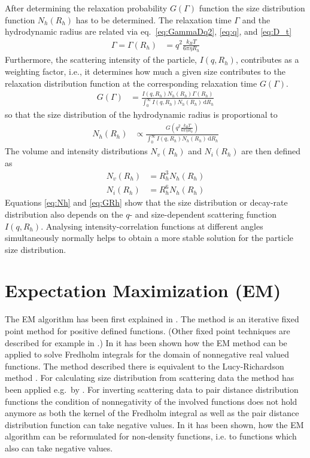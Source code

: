After determining the relaxation probability $G(\Gamma)$ function the size distribution function $N_h(R_h)$ has to be determined. The relaxation time $\Gamma$ and the hydrodynamic radius are related via eq.\ \ref{eq:GammaDq2}, \ref{eq:q}, and \ref{eq:D_t}
\begin{align}
\Gamma = \Gamma(R_h)&= q^2 \frac{k_BT}{6\pi\eta R_h}
\end{align}
Furthermore, the scattering intensity of the particle, $I(q,R_h)$, contributes as a weighting factor, i.e., it determines how much a given size contributes to the relaxation distribution function at the corresponding relaxation time $G(\Gamma)$.
\begin{align}
\label{eq:GRh}
G(\Gamma) &= \frac{I(q,R_h) N_h(R_h) \Gamma(R_h)} {\int_0^\infty I(q,R_h) N_h(R_h) \, \mathrm{d}R_h}
\end{align}
so that the size distribution of the hydrodynamic radius is proportional to
\begin{align}
\label{eq:Nh}
N_h(R_h) &\propto  \frac{G\left(q^2 \frac{k_BT}{6\pi\eta R_h}\right)}{\int_0^\infty I(q,R_h) N_h(R_h) \, \mathrm{d}R_h}
\end{align}
The volume and intensity distributions $N_v(R_h)$ and $N_i(R_h)$ are then defined as
\begin{align}
N_v(R_h) &= R_h^3 N_h(R_h) \\
N_i(R_h) &= R_h^6 N_h(R_h)
\end{align}
Equations \ref{eq:Nh} and \ref{eq:GRh} show that the size distribution or decay-rate distribution also depends on the $q$- and size-dependent scattering function $I(q,R_h)$. Analysing intensity-correlation functions at different angles simultaneously normally helps to obtain a more stable solution for the particle size distribution.

\section{Expectation Maximization (EM)}
The EM algorithm has been first explained in \cite{Dempster1977}. The method is an iterative fixed point method for positive defined functions. (Other fixed point techniques are described for example in \cite{Hanke2000}.) In \cite{Vardi1993} it has been shown how the EM method can be applied to solve Fredholm integrals for the domain of nonnegative real valued functions. The method described there is equivalent to the Lucy\hyp{}Richardson method \cite{Richardson1972,Lucy1974}. For calculating size distribution from scattering data the method has been applied e.g.\ by \cite{Yang2013,Benvenuto2016,Benvenuto2017,Bakry2019}. For inverting scattering data to pair distance distribution functions the condition of nonnegativity of the involved functions does not hold anymore as both the kernel of the Fredholm integral as well as the pair distance distribution function can take negative values. In \cite{Chae2018} it has been shown, how the EM algorithm can be reformulated for non-density functions, i.e. to functions which also can take negative values.

